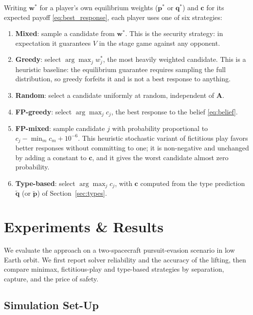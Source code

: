 \documentclass[letterpaper, 10 pt, conference]{ieeeconf}  %
\begin{document}
Writing $\mathbf{w}^*$ for a player's own equilibrium weights ($\mathbf{p}^*$ or $\mathbf{q}^*$) and $\mathbf{c}$ for its expected payoff \eqref{eq:best_response}, each player uses one of six strategies:
%
\begin{enumerate}
    \item \textbf{Mixed}: sample a candidate from $\mathbf{w}^*$. This is the security strategy: in expectation it guarantees $V$ in the stage game against any opponent.
    \item \textbf{Greedy}: select $\arg\max_j w^*_j$, the most heavily weighted candidate. This is a heuristic baseline: the equilibrium guarantee requires sampling the full distribution, so greedy forfeits it and is not a best response to anything.
    \item \textbf{Random}: select a candidate uniformly at random, independent of $\mathbf{A}$.
    \item \textbf{FP-greedy}: select $\arg\max_j c_j$, the best response to the belief \eqref{eq:belief}.
    \item \textbf{FP-mixed}: sample candidate $j$ with probability proportional to $c_j - \min_m c_m + 10^{-6}$. This heuristic stochastic variant of fictitious play favors better responses without committing to one; it is non-negative and unchanged by adding a constant to $\mathbf{c}$, and it gives the worst candidate almost zero probability.
    \item \textbf{Type-based}: select $\arg\max_j c_j$, with $\mathbf{c}$ computed from the type prediction $\tilde{\mathbf{q}}$ (or $\tilde{\mathbf{p}}$) of Section~\ref{sec:types}.
\end{enumerate}



\section{Experiments \& Results}
\label{sec:results}
% 

We evaluate the approach on a two-spacecraft pursuit-evasion scenario in low Earth orbit. We first report solver reliability and the accuracy of the lifting, then compare minimax, fictitious-play and type-based strategies by separation, capture, and the price of safety.

\subsection{Simulation Set-Up}
\end{document}

